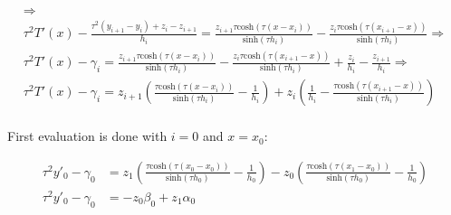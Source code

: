 \documentclass{article}
\begin{document}
\begin{multline*}
{           }
           \Rightarrow
           \\
           \tau^2T'(x)
           -
           \frac {
             \tau^2(y_{i+1}-y_i)+z_i-z_{i+1}
           }
           {
             h_i
           }
           =
           \frac{
             z_{i+1}\tau\textrm{cosh}(\tau(x-x_{i}))
           }
           {
             \textrm{sinh}(\tau h_i)
           }
           -
           \frac{
             z_i\tau\mathrm{cosh}(\tau(x_{i+1}-x))
           }
           {
             \textrm{sinh}(\tau h_i)
           }
           \Rightarrow
           \\
           \tau^2T'(x)
           -
           \gamma_i
           =
           \frac{
             z_{i+1}\tau\textrm{cosh}(\tau(x-x_{i}))
           }
           {
             \textrm{sinh}(\tau h_i)
           }
           -
           \frac{
             z_i\tau\mathrm{cosh}(\tau(x_{i+1}-x))
           }
           {
             \textrm{sinh}(\tau h_i)
           }
           +
           \frac{z_i}{h_i}
           -
           \frac{z_{i+1}}{h_i}
           \Rightarrow
           \\
           \tau^2T'(x)
           -
           \gamma_i
           =
           z_{i+1}
           (
             \frac{
               \tau\textrm{cosh}(\tau(x-x_{i}))
             }
             {
               \textrm{sinh}(\tau h_i)
             }
             -
             \frac {
               1
             }
             {
               h_i
             }
           )
           +
           z_i
           (
             \frac {
               1
             }
             {
               h_i
             }
             -
             \frac{
               \tau\mathrm{cosh}(\tau(x_{i+1}-x))
             }
             {
               \textrm{sinh}(\tau h_i)
             }
           )
  \end{multline*} \\

  First evaluation is done with $i=0$ and $x=x_0$:

  \begin{align*}
           \tau^2y'_0
           -
           \gamma_0
           &=
           z_{1}
           (
             \frac{
               \tau\textrm{cosh}(\tau(x_0-x_{0}))
             }
             {
               \textrm{sinh}(\tau h_0)
             }
             -
             \frac {
               1
             }
             {
               h_0
             }
           )
           -z_0
           (
             \frac{
               \tau\mathrm{cosh}(\tau(x_{1}-x_0))
             }
             {
               \textrm{sinh}(\tau h_0)
             }
             -
             \frac {
               1
             }
             {
               h_0
             }
           )
           \\
           \tau^2y'_0
           -
           \gamma_0
           &=
           -z_0\beta_0
           +
           z_{1}\alpha_0
  \end{align*}
\end{document}
